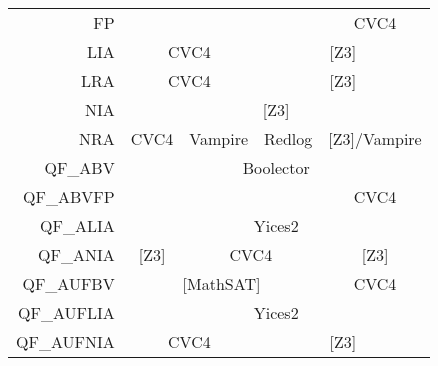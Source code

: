 \begin{table}
{\begin{tabular}{|rcccc|}
FP                               & \multicolumn{1}{l}{}          & \multicolumn{1}{l}{}                & \multicolumn{1}{l|}{}         & \multicolumn{1}{c|}{CVC4}             \\ \cline{2-5}
\multicolumn{1}{|r|}{LIA}        & \multicolumn{2}{c|}{CVC4}                                           & \multicolumn{2}{c|}{{[}Z3{]}}                                         \\ \cline{2-5}
\multicolumn{1}{|r|}{LRA}        & \multicolumn{2}{c|}{CVC4}                                           & \multicolumn{2}{c|}{{[}Z3{]}}                                         \\ \cline{2-5}
\multicolumn{1}{|r|}{NIA}        & \multicolumn{4}{c|}{{[}Z3{]}}                                                                                                               \\ \cline{2-5}
\multicolumn{1}{|r|}{NRA}        & \multicolumn{1}{c|}{CVC4}     & \multicolumn{1}{c|}{Vampire}        & \multicolumn{1}{c|}{Redlog}   & \multicolumn{1}{c|}{{[}Z3{]}/Vampire} \\ \cline{2-5}
\multicolumn{1}{|r|}{QF\_ABV}    & \multicolumn{4}{c|}{Boolector}                                                                                                              \\ \cline{2-5}
QF\_ABVFP                        & \multicolumn{1}{l}{}          & \multicolumn{1}{l}{}                & \multicolumn{1}{l|}{}         & \multicolumn{1}{c|}{CVC4}             \\ \cline{2-5}
\multicolumn{1}{|r|}{QF\_ALIA}   & \multicolumn{4}{c|}{Yices2}                                                                                                                 \\ \cline{2-5}
\multicolumn{1}{|r|}{QF\_ANIA}   & \multicolumn{1}{c|}{{[}Z3{]}} & \multicolumn{2}{c|}{CVC4}                                           & \multicolumn{1}{c|}{{[}Z3{]}}         \\ \cline{2-5}
\multicolumn{1}{|r|}{QF\_AUFBV}  & \multicolumn{3}{c|}{{[}MathSAT{]}}                                                                  & \multicolumn{1}{c|}{CVC4}             \\ \cline{2-5}
\multicolumn{1}{|r|}{QF\_AUFLIA} & \multicolumn{4}{c|}{Yices2}                                                                                                                 \\ \cline{2-5}
\multicolumn{1}{|r|}{QF\_AUFNIA} & \multicolumn{2}{c|}{CVC4}                                           & \multicolumn{2}{c|}{{[}Z3{]}}                                         \\ \cline{2-5}

\end{tabular}}
\end{table}
